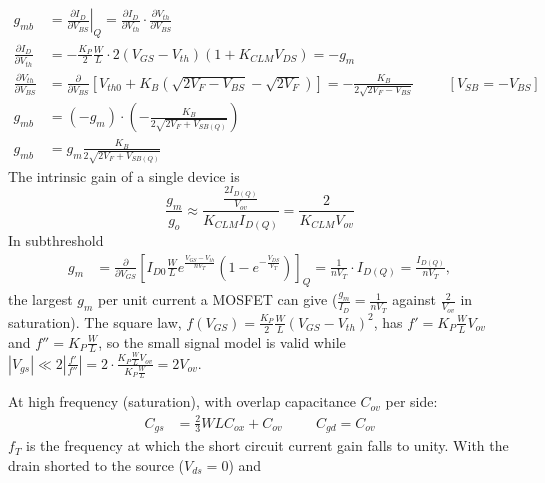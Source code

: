 \begin{itemize}
\begin{itemize}
        \begin{align*}
          g_{mb} &= \left.\frac{\partial I_D}{\partial V_{BS}}\right|_{Q}
                  = \frac{\partial I_D}{\partial V_{th}} \cdot \frac{\partial V_{th}}{\partial V_{BS}} \\
          \frac{\partial I_D}{\partial V_{th}} &= -\frac{K_P}{2} \frac{W}{L} \cdot 2 (V_{GS} - V_{th}) (1 + K_{CLM} V_{DS}) = -g_m \\
          \frac{\partial V_{th}}{\partial V_{BS}} &= \frac{\partial}{\partial V_{BS}} \left[ V_{th0} + K_B \left( \sqrt{2V_F - V_{BS}} - \sqrt{2V_F} \right) \right] = -\frac{K_B}{2\sqrt{2V_F - V_{BS}}} \hspace{1cm} [V_{SB} = -V_{BS}] \\
          g_{mb} &= \left(-g_m\right) \cdot \left(-\frac{K_B}{2\sqrt{2V_F + V_{SB(Q)}}}\right) \\
          g_{mb} &= g_m \frac{K_B}{2\sqrt{2V_F + V_{SB(Q)}}}
        \end{align*}
        The intrinsic gain of a single device is
        \[
          \frac{g_m}{g_o} \approx \frac{\frac{2 I_{D(Q)}}{V_{ov}}}{K_{CLM} I_{D(Q)}} = \frac{2}{K_{CLM} V_{ov}}
        \]
        In subthreshold
        \begin{align*}
          g_m &= \frac{\partial}{\partial V_{GS}} \left[ I_{D0} \frac{W}{L} e^{\frac{V_{GS} - V_{th}}{n V_T}} \left(1 - e^{-\frac{V_{DS}}{V_T}}\right) \right]_Q
               = \frac{1}{n V_T} \cdot I_{D(Q)} = \frac{I_{D(Q)}}{n V_T},
        \end{align*}
        the largest \(g_m\) per unit current a MOSFET can give
        (\(\frac{g_m}{I_D} = \frac{1}{nV_T}\) against \(\frac{2}{V_{ov}}\) in saturation).
        The square law, \(f(V_{GS}) = \frac{K_P}{2}\frac{W}{L}(V_{GS} - V_{th})^2\), has
        \(f' = K_P \frac{W}{L} V_{ov}\) and \(f'' = K_P \frac{W}{L}\), so the
        small signal model is valid while
        \(|V_{gs}| \ll 2 \left|\frac{f'}{f''}\right| = 2 \cdot \frac{K_P \frac{W}{L} V_{ov}}{K_P \frac{W}{L}} = 2V_{ov}\).
        \par At high frequency (saturation), with overlap capacitance
            \(C_{ov}\) per side:
            \begin{align*}
              C_{gs} &= \frac{2}{3} W L C_{ox} + C_{ov} \hspace{1cm}
              C_{gd} = C_{ov}
            \end{align*}
            \(f_T\) is the frequency at which the short circuit current gain falls
            to unity. With the drain shorted to the source (\(V_{ds} = 0\)) and

\end{itemize}
\end{itemize}
